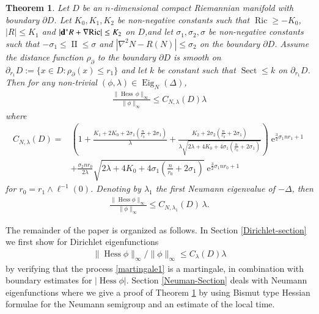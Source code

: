 \documentclass[11pt,reqno]{amsart}
\newtheorem{theorem}{Theorem}[section]
\theoremstyle{definition} \newtheorem{remark}[theorem]{Remark}
\numberwithin{equation}{section}
\def\Ric{{\operatorname{Ric}}} \def\Hess{\operatorname{Hess}}
\def\Sect{{\operatorname{Sect}}}
\newcommand\1{\mathbbm{1}}
\def\Ric{{\operatorname{Ric}}} \def\Aut{{\operatorname{Aut}}}
\def\Eig{\operatorname{Eig}} \def\II{{\operatorname{II}}}
\def\bd{{\bf d}}
\def\r{\right}
\def\l{\left} \def\e{\operatorname{e}} \def\dsum{\displaystyle\sum}
\def\II{{\operatorname{II}}}
\begin{document}
\begin{theorem}\label{Neumann-them}
Let $D$ be an $n$-dimensional compact Riemannian manifold with
boundary $\partial D$. Let $K_0, K_1, K_2$  be non-negative constants such that $\Ric\geq- K_0$, $|R|\leq K_1$ and
$|\bd^* R+\nabla \Ric|\leq K_2$ on $D$,and let $\sigma_1,\sigma_2,\sigma$ be non-negative constants such that
$-\sigma_1\leq \II\leq \sigma$ and $|\nabla^2 N-R(N)|\leq \sigma_2$ on the
boundary $\partial D$. Assume the distance function $\rho_{\partial }$
to the boundary $\partial D$ is smooth on $\partial_{r_1}D:=\{x\in D: \rho_{\partial }(x)\leq r_1\}$ and let $k$ be constant such that $\Sect\leq k$ on $\partial_{r_1}D$. Then for any non-trivial
$(\phi,\lambda) \in \Eig_N(\Delta)$, 
\begin{align*}
\frac{\|\Hess \,\phi\|_{\infty}}{\|\phi\|_{\infty}}\leq C_{N,\lambda}(D)\lambda
\end{align*}
where
\begin{align*}
C_{N,\lambda}(D)=&\l(1+\frac{K_1+2K_0+2\sigma_1 \left(\frac{n}{r_0}+2\sigma_1\right)}{\lambda}+\frac{K_2+2\sigma_2 \left(\frac{n}{r_0}+2\sigma_1\right)}{\lambda\sqrt{2\lambda+4K_0+4\sigma_1\left(\frac{n}{r_0}+2\sigma_1\right)}}\r)\e^{\frac{3}{2}\sigma_1 n r_1+1}\\
&+\frac{ \sigma_2 n r_0}{2\lambda}\sqrt{2\lambda+4K_0+4\sigma_1\left(\frac{n}{r_0}+2\sigma_1\right)}\e^{\frac{3}{2}\sigma_1 n r_0+1}
\end{align*}
for $r_0=r_1\wedge \ell^{-1}(0)$.
Denoting by $\lambda_1$ the first Neumann eigenvalue of $-\Delta$, then 
\begin{align*}
\frac{\|\Hess \phi\|_{\infty}}{\|\phi\|_{\infty}}\leq C_{N,\lambda_1}(D) \,\lambda.
\end{align*}
\end{theorem}



The remainder of the paper is organized as follows. In Section \ref{Dirichlet-section} we first
show for Dirichlet eigenfunctions
\begin{align}\label{main-ineq1}
\|\Hess \phi\|_{\infty}/\|\phi\|_{\infty}\leq C_{\lambda}(D)\lambda
\end{align} by verifying that
the process \eqref{martingale1} is a martingale, in combination with boundary estimates
for $|\Hess \phi|$. 
Section \ref{Neuman-Section} deals with Neumann eigenfunctions where we give a proof of Theorem \ref{Neumann-them} by using Bismut type Hessian formulae for the Neumann semigroup and an estimate of the local time.
\end{document}

